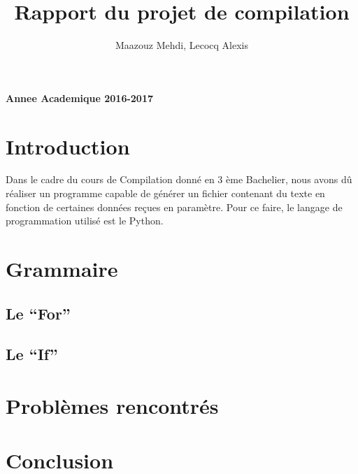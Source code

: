\documentclass[a4paper,10pt]{article}
\title{Rapport du projet de compilation}
\author{Maazouz Mehdi, Lecocq Alexis}
\begin{document}
\maketitle
\textbf{Annee Academique 2016-2017}\\
\tableofcontents
\newpage

\section{Introduction}
Dans le cadre du cours de Compilation donné en 3 ème Bachelier, nous avons dû réaliser un programme
capable de générer un fichier contenant du texte en fonction de certaines données reçues en paramètre.
Pour ce faire, le langage de programmation utilisé est le Python.
\section{Grammaire}
\subsection{Le ``For''}
\subsection{Le ``If''}
\section{Problèmes rencontrés}
\section{Conclusion}
\end{document}

